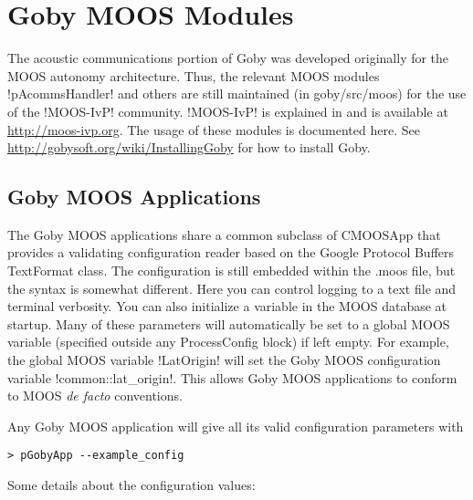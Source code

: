 \chapter{Goby MOOS Modules}\label{chap:MOOS}
\MakeShortVerb{\!} %

The acoustic communications portion of Goby was developed originally for the MOOS autonomy architecture. Thus, the relevant MOOS modules !pAcommsHandler! and others are still maintained (in goby/src/moos) for the use of the !MOOS-IvP! community. !MOOS-IvP! is explained in \cite{moos-ivp-jfr} and is available at \url{http://moos-ivp.org}. The usage of these modules is documented here. See \url{http://gobysoft.org/wiki/InstallingGoby} for how to install Goby.


\section{Goby MOOS Applications} \label{sec:goby_moos_app}

The Goby MOOS applications share a common subclass of CMOOSApp that provides a validating configuration reader based on the Google Protocol Buffers TextFormat class. The configuration is still embedded within the .moos file, but the syntax is somewhat different. Here you can control logging to a text file and terminal verbosity. You can also initialize a variable in the MOOS database at startup. Many of these parameters will automatically be set to a global MOOS variable (specified outside any ProcessConfig block) if left empty. For example, the global MOOS variable !LatOrigin! will set the Goby MOOS configuration variable !common::lat_origin!. This allows Goby MOOS applications to conform to MOOS \textit{de facto} conventions.

Any Goby MOOS application will give all its valid configuration parameters with \begin{verbatim}
> pGobyApp --example_config
\end{verbatim} 

\resetbvlinenumber

Some details about the configuration values:

